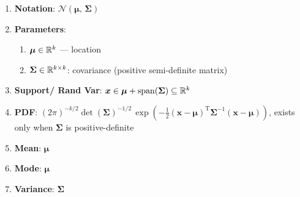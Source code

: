 \begin{enumerate}

    \item
    \textbf{Notation}:
    $  {\displaystyle {\mathcal {N}}({\boldsymbol {\mu }},\,{\boldsymbol {\Sigma }})} $
    \hfill \cite{wiki/Multivariate_normal_distribution}

    \item
    \textbf{Parameters}:
    \begin{enumerate}
        \item $\bm{\mu} \in \mathbb{R}^k$ — location
        \hfill \cite{wiki/Multivariate_normal_distribution}

        \item $\bm{\Sigma} \in \mathbb{R}^{k \times k}$: covariance (positive semi-definite matrix)
        \hfill \cite{wiki/Multivariate_normal_distribution}
    \end{enumerate}

    \item
    \textbf{Support/ Rand Var}:
    $  \bm{x} \in \bm{\mu} + \text{span}(\bm{\Sigma}) \subseteq \mathbb{R}^k $
    \hfill \cite{wiki/Multivariate_normal_distribution}

    \item
    \textbf{PDF}:
     ${\displaystyle (2\pi )^{-k/2}\det({\boldsymbol {\Sigma }})^{-1/2}\,\exp \left(-{\frac {1}{2}}(\mathbf {x} -{\boldsymbol {\mu }})^{\mathrm {T} }{\boldsymbol {\Sigma }}^{-1}(\mathbf {x} -{\boldsymbol {\mu }})\right)}$, exists only when $\bm{\Sigma}$ is positive-definite
    \hfill\cite{wiki/Multivariate_normal_distribution}



    \item
    \textbf{Mean}:
    $ \bm{\mu} $
    \hfill\cite{wiki/Multivariate_normal_distribution}


    \item
    \textbf{Mode}:
    $ \bm{\mu} $
    \hfill\cite{wiki/Multivariate_normal_distribution}

    \item
    \textbf{Variance}:
    $ \bm{\Sigma} $
    \hfill\cite{wiki/Multivariate_normal_distribution}


\end{enumerate}
